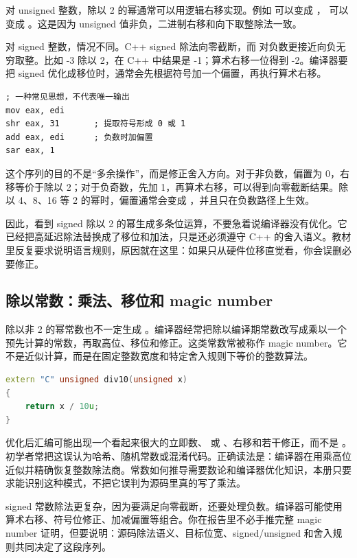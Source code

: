 对 unsigned 整数，除以 2 的幂通常可以用逻辑右移实现。例如  可以变成 ， 可以变成 。这是因为 unsigned 值非负，二进制右移和向下取整除法一致。

对 signed 整数，情况不同。C++ signed 除法向零截断，而  对负数更接近向负无穷取整。比如 -3 除以 2，在 C++ 中结果是 -1；算术右移一位得到 -2。编译器要把 signed  优化成移位时，通常会先根据符号加一个偏置，再执行算术右移。

\begin{lstlisting}
; 一种常见思想，不代表唯一输出
mov eax, edi
shr eax, 31       ; 提取符号形成 0 或 1
add eax, edi      ; 负数时加偏置
sar eax, 1
\end{lstlisting}

这个序列的目的不是“多余操作”，而是修正舍入方向。对于非负数，偏置为 0，右移等价于除以 2；对于负奇数，先加 1，再算术右移，可以得到向零截断结果。除以 4、8、16 等 2 的幂时，偏置通常会变成 ，并且只在负数路径上生效。

因此，看到 signed 除以 2 的幂生成多条位运算，不要急着说编译器没有优化。它已经把高延迟除法替换成了移位和加法，只是还必须遵守 C++ 的舍入语义。教材里反复要求说明语言规则，原因就在这里：如果只从硬件位移直觉看，你会误删必要修正。

\subsection{除以常数：乘法、移位和 magic number}

除以非 2 的幂常数也不一定生成 。编译器经常把除以编译期常数改写成乘以一个预先计算的常数，再取高位、移位和修正。这类常数常被称作 magic number。它不是近似计算，而是在固定整数宽度和特定舍入规则下等价的整数算法。

\begin{lstlisting}[language=C++]
extern "C" unsigned div10(unsigned x)
{
    return x / 10u;
}
\end{lstlisting}

优化后汇编可能出现一个看起来很大的立即数、 或 、右移和若干修正，而不是 。初学者常把这误认为哈希、随机常数或混淆代码。正确读法是：编译器在用乘高位近似并精确恢复整数除法商。常数如何推导需要数论和编译器优化知识，本册只要求能识别这种模式，不把它误判为源码里真的写了乘法。

signed 常数除法更复杂，因为要满足向零截断，还要处理负数。编译器可能使用算术右移、符号位修正、加减偏置等组合。你在报告里不必手推完整 magic number 证明，但要说明：源码除法语义、目标位宽、signed/unsigned 和舍入规则共同决定了这段序列。

